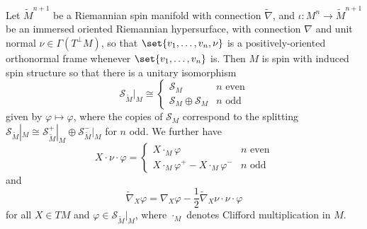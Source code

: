 \documentclass[11pt]{report}
\renewcommand{\S}{\mathcal{S}}
\begin{document}
\begin{proposition}
    Let $\tilde M^{n + 1}$ be a Riemannian spin manifold with connection $\tilde\nabla$, and $\iota : M^n \to \tilde M^{n + 1}$ be an immersed oriented Riemannian hypersurface, with connection $\nabla$ and unit normal $\nu \in \Gamma(T^\perp M)$, so that $\set{v_1, \ldots, v_n, \nu}$ is a positively-oriented orthonormal frame whenever $\set{v_1, \ldots, v_n}$ is. Then $M$ is spin with induced spin structure so that there is a unitary isomorphism
    $$
        \S_{\tilde M}|_M \cong \begin{cases}
            \S_M &n \text{ even} \\
            \S_M \oplus \S_M &n \text{ odd}
        \end{cases}
    $$
    given by $\varphi \mapsto \varphi$, where the copies of $\S_M$ correspond to the splitting $\S_{\tilde M}|_M \cong \S_{\tilde M}^+|_M \oplus \S_{\tilde M}^-|_M$ for $n$ odd. We further have
    $$
        X \cdot \nu \cdot \varphi = \begin{cases}
            X \cdot_M \varphi &n \text{ even} \\
            X \cdot_M \varphi^+ - X \cdot_M \varphi^- &n \text{ odd}
        \end{cases}
    $$
    and
    $$
        \tilde\nabla_X\varphi = \nabla_X\varphi - \frac12\tilde\nabla_X\nu \cdot \nu \cdot \varphi
    $$
    for all $X \in TM$ and $\varphi \in \S_{\tilde M}|_M$, where $\cdot_M$ denotes Clifford multiplication in $M$.
\end{proposition}
\end{document}
